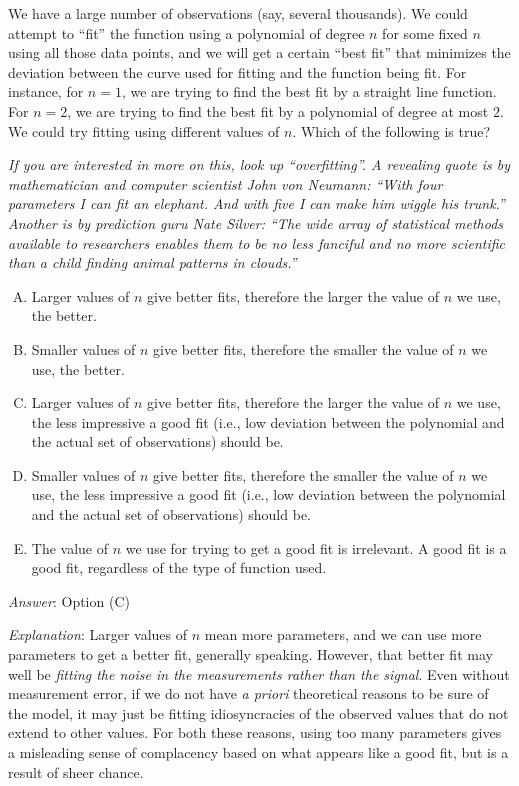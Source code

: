 \documentclass[10pt]{amsart}
\begin{document}
\begin{enumerate}
  We have a large number of observations (say, several thousands). We
  could attempt to ``fit'' the function using a polynomial of degree
  $n$ for some fixed $n$ using all those data points, and we will get
  a certain ``best fit'' that minimizes the deviation between the
  curve used for fitting and the function being fit. For instance, for
  $n = 1$, we are trying to find the best fit by a straight line
  function. For $n = 2$, we are trying to find the best fit by a
  polynomial of degree at most $2$. We could try fitting using
  different values of $n$. Which of the following is true?

  {\em If you are interested in more on this, look up
    ``overfitting''. A revealing quote is by mathematician and
    computer scientist John von Neumann: ``With four parameters I can
    fit an elephant. And with five I can make him wiggle his trunk.''
    Another is by prediction guru Nate Silver: ``The wide array of
    statistical methods available to researchers enables them to be no
    less fanciful and no more scientific than a child finding animal
    patterns in clouds.''}

  \begin{enumerate}[(A)]
  \item Larger values of $n$ give better fits, therefore the larger
    the value of $n$ we use, the better.
  \item Smaller values of $n$ give better fits, therefore the smaller
    the value of $n$ we use, the better.
  \item Larger values of $n$ give better fits, therefore the larger
    the value of $n$ we use, the less impressive a good fit (i.e., low
    deviation between the polynomial and the actual set of
    observations) should be.
  \item Smaller values of $n$ give better fits, therefore the smaller
    the value of $n$ we use, the less impressive a good fit (i.e., low
    deviation between the polynomial and the actual set of
    observations) should be.
  \item The value of $n$ we use for trying to get a good fit is
    irrelevant. A good fit is a good fit, regardless of the type of
    function used.
  \end{enumerate}

  {\em Answer}: Option (C)

  {\em Explanation}: Larger values of $n$ mean more parameters, and we
  can use more parameters to get a better fit, generally
  speaking. However, that better fit may well be {\em fitting the
    noise in the measurements rather than the signal}. Even without
  measurement error, if we do not have {\em a priori} theoretical
  reasons to be sure of the model, it may just be fitting
  idiosyncracies of the observed values that do not extend to other
  values. For both these reasons, using too many parameters gives a
  misleading sense of complacency based on what appears like a good
  fit, but is a result of sheer chance.


\end{enumerate}
\end{document}
